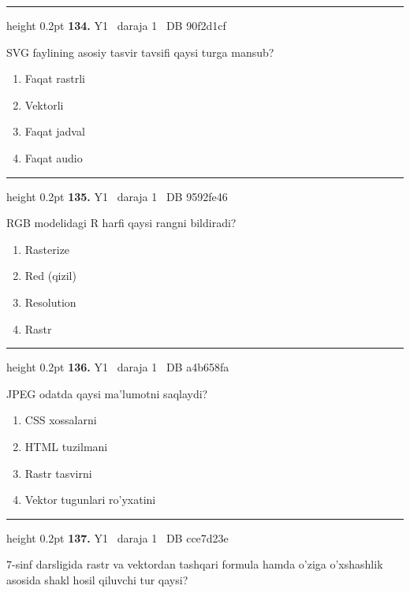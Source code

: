 \documentclass[10pt,a4paper,oneside]{article}
\begin{document}
\vspace{2mm}\hrule height 0.2pt \vspace{4mm}
\hypertarget{q134}{\textbf{\color{ink}134.}}  {\color{muted}\scriptsize Y1 \textbullet\ daraja 1 \textbullet\ DB 90f2d1cf}
\par
SVG faylining asosiy tasvir tavsifi qaysi turga mansub?
\begin{enumerate}[label=\Alph*),leftmargin=9mm]
\item Faqat rastrli
\item Vektorli
\item Faqat jadval
\item Faqat audio
\end{enumerate}
\vspace{2mm}\hrule height 0.2pt \vspace{4mm}
\hypertarget{q135}{\textbf{\color{ink}135.}}  {\color{muted}\scriptsize Y1 \textbullet\ daraja 1 \textbullet\ DB 9592fe46}
\par
RGB modelidagi R harfi qaysi rangni bildiradi?
\begin{enumerate}[label=\Alph*),leftmargin=9mm]
\item Rasterize
\item Red (qizil)
\item Resolution
\item Rastr
\end{enumerate}
\vspace{2mm}\hrule height 0.2pt \vspace{4mm}
\hypertarget{q136}{\textbf{\color{ink}136.}}  {\color{muted}\scriptsize Y1 \textbullet\ daraja 1 \textbullet\ DB a4b658fa}
\par
JPEG odatda qaysi ma'lumotni saqlaydi?
\begin{enumerate}[label=\Alph*),leftmargin=9mm]
\item CSS xossalarni
\item HTML tuzilmani
\item Rastr tasvirni
\item Vektor tugunlari ro'yxatini
\end{enumerate}
\vspace{2mm}\hrule height 0.2pt \vspace{4mm}
\hypertarget{q137}{\textbf{\color{ink}137.}}  {\color{muted}\scriptsize Y1 \textbullet\ daraja 1 \textbullet\ DB cce7d23e}
\par
7-sinf darsligida rastr va vektordan tashqari formula hamda o'ziga o'xshashlik asosida shakl hosil qiluvchi tur qaysi?
\end{document}
